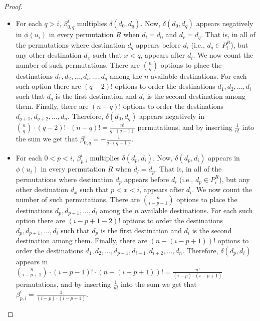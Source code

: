 \documentclass[sigconf]{aamas}
\begin{document}
\begin{proof}
\begin{itemize}
\item For each $q>i$, $\beta_{0,q}^i$ multiplies $\delta(d_0,d_q)$. Now, 
$\delta(d_0,d_q)$ appears negatively in $\phi(u_i)$ in every permutation $R$ when $d_l=d_0$ and $d_r=d_q$. That is, in all of the permutations where destination $d_q$ appears before $d_i$ (i.e., $d_q \in P^R_i$), but any other destination $d_x$ such that $x<q$, appears after $d_i$. We now count the number of such permutations. There are $\binom{n}{q}$ options to place the destinations $d_1,d_2,...,d_i,...,d_q$ among the $n$ available destinations. For each such option there are $(q-2)!$ options to order the destinations $d_1,d_2,...,d_i$ such that $d_q$ is the first destination and $d_i$ is the second destination among them. Finally, there are $(n-q)!$ options to order the destinations $d_{q+1},d_{q+2},...,d_n$. Therefore, $\delta(d_0,d_q)$ appears negatively in $\binom{n}{q} \cdot (q-2)! \cdot (n-q)! = \frac{n!}{q\cdot (q-1)}$ permutations, and by inserting $\frac{1}{n!}$ into the sum we get that $\beta_{0,q}^i = -\frac{1}{q\cdot (q-1)}$.



\item For each $0<p<i$, $\beta_{p,i}^i$ multiplies $\delta(d_p,d_i)$. Now, 
$\delta(d_p,d_i)$ appears in $\phi(u_i)$ in every permutation $R$ when $d_l=d_p$. That is, in all of the permutations where destination $d_p$ appears before $d_i$ (i.e., $d_p \in P^R_i$), but any other destination $d_x$ such that $p<x<i$, appears after $d_i$. We now count the number of such permutations. There are $\binom{n}{i-p+1}$ options to place the destinations $d_p,d_{p+1},...,d_i$ among the $n$ available destinations. For each such option there are $(i-p+1-2)!$ options to order the destinations $d_p,d_{p+1},...,d_i$ such that $d_p$ is the first destination and $d_i$ is the second destination among them. Finally, there are $(n-(i-p+1))!$ options to order the destinations $d_1, d_2,...,d_{p-1},d_{i+1},d_{i+2},...,d_n$. Therefore, $\delta(d_p,d_i)$ appears in $\binom{n}{i-p+1} \cdot (i-p-1)! \cdot (n-(i-p+1))! = \frac{n!}{(i-p)\cdot (i-p+1)}$ permutations, and by inserting $\frac{1}{n!}$ into the sum we get that $\beta_{p,i}^i = \frac{1}{(i-p)\cdot (i-p+1)}$.


\end{itemize}
\end{proof}
\end{document}
